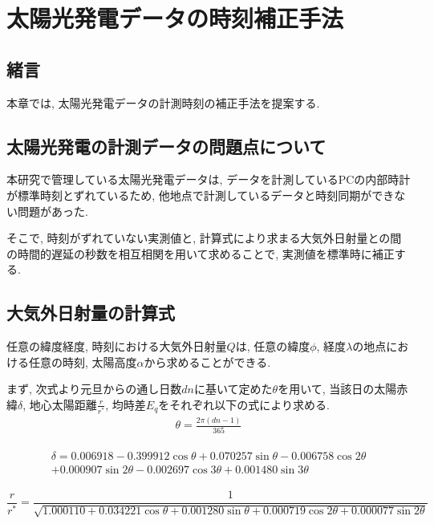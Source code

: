 
\chapter{太陽光発電データの時刻補正手法}
\label{chap:second}

\section{緒言}
本章では, 太陽光発電データの計測時刻の補正手法を提案する.


\section{太陽光発電の計測データの問題点について}
本研究で管理している太陽光発電データは, データを計測しているPCの内部時計が標準時刻とずれているため, 他地点で計測しているデータと時刻同期ができない問題があった. 

そこで, 時刻がずれていない実測値と, 計算式により求まる大気外日射量との間の時間的遅延の秒数を相互相関を用いて求めることで, 実測値を標準時に補正する.

\section{大気外日射量の計算式}
任意の緯度経度, 時刻における大気外日射量$Q$は, 任意の緯度$\phi$, 経度$\lambda$の地点における任意の時刻, 太陽高度$\alpha$から求めることができる.

まず, 次式より元旦からの通し日数$dn$に基いて定めた$\theta$を用いて, 当該日の太陽赤緯$\delta$, 地心太陽距離$\frac{r}{r^{*}}$, 均時差$E_q$をそれぞれ以下の式により求める.
\begin{eqnarray}
  \theta =  \frac{2\pi (dn-1)}{365}
\end{eqnarray}

\begin{eqnarray}
  \begin{split}
    \delta =  0.006918-0.399912\cos \theta+0.070257\sin \theta-0.006758\cos 2\theta\\
    +0.000907\sin 2\theta-0.002697\cos 3\theta+0.001480\sin 3\theta
  \end{split}
\end{eqnarray}

\begin{dmath}
  \frac{r}{r^{*}} =  \frac{1}{\sqrt{1.000110+0.034221\cos \theta+0.001280\sin \theta+0.000719\cos 2\theta+0.000077\sin 2\theta}}
\end{dmath}

